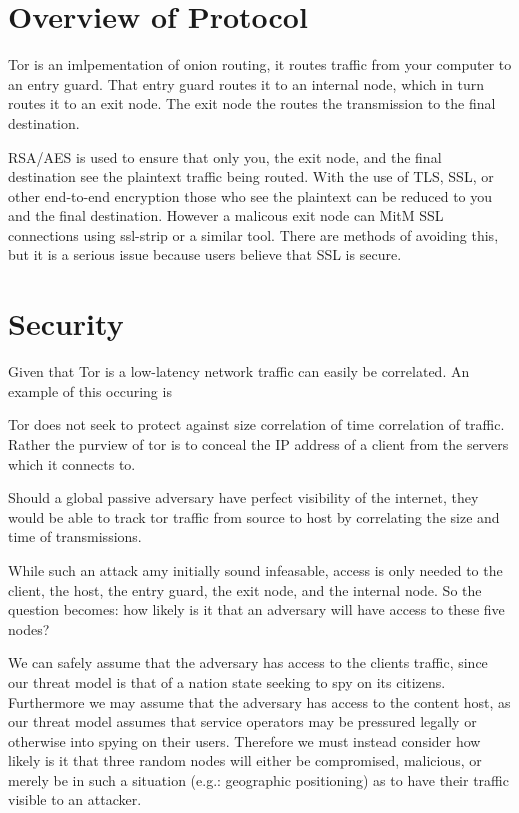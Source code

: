 \section{Overview of Protocol}
Tor is an imlpementation of onion routing, it routes traffic from your computer
to an entry guard. That entry guard routes it to an internal node, which in turn
routes it to an exit node. The exit node the routes the transmission to the
final destination.

RSA/AES is used to ensure that only you, the exit node, and the final
destination see the plaintext traffic being routed. With the use of TLS, SSL, or
other end-to-end encryption those who see the plaintext can be reduced to you
and the final destination. However a malicous exit node can MitM SSL connections
using ssl-strip or a similar tool. There are methods of avoiding this, but it is
a serious issue because users believe that SSL is secure.

\section{Security}
Given that Tor is a low-latency network traffic can easily be correlated. An
example of this occuring is 

Tor does not seek to protect against size correlation of time correlation of
traffic. Rather the purview of tor is to conceal the IP address of a client from
the servers which it connects to.

Should a global passive adversary have perfect visibility of the internet, they
would be able to track tor traffic from source to host by correlating the size
and time of transmissions.

While such an attack amy initially sound infeasable, access is only needed to
the client, the host, the entry guard, the exit node, and the internal node.
So the question becomes: how likely is it that an adversary will have access to
these five nodes?

We can safely assume that the adversary has access to the clients traffic, since
our threat model is that of a nation state seeking to spy on its citizens.
Furthermore we may assume that the adversary has access to the content host, as
our threat model assumes that service operators may be pressured legally or
otherwise into spying on their users. Therefore we must instead consider how
likely is it that three random nodes will either be compromised, malicious, or
merely be in such a situation (e.g.: geographic positioning) as to have their
traffic visible to an attacker.

